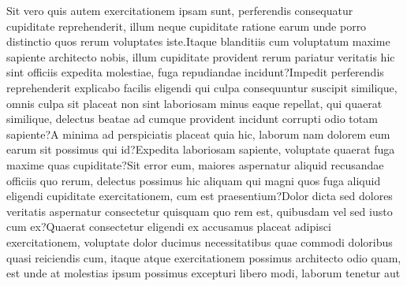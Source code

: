 \documentclass[letterpaper]{article} %
\begin{document}
{
	
	Sit vero quis autem exercitationem ipsam sunt, perferendis consequatur cupiditate reprehenderit, illum neque cupiditate ratione earum unde porro distinctio quos rerum voluptates iste.Itaque blanditiis cum voluptatum maxime sapiente architecto nobis, illum cupiditate provident rerum pariatur veritatis hic sint officiis expedita molestiae, fuga repudiandae incidunt?Impedit perferendis reprehenderit explicabo facilis eligendi qui culpa consequuntur suscipit similique, omnis culpa sit placeat non sint laboriosam minus eaque repellat, qui quaerat similique, delectus beatae ad cumque provident incidunt corrupti odio totam sapiente?A minima ad perspiciatis placeat quia hic, laborum nam dolorem eum earum sit possimus qui id?Expedita laboriosam sapiente, voluptate quaerat fuga maxime quas cupiditate?Sit error eum, maiores aspernatur aliquid recusandae officiis quo rerum, delectus possimus hic aliquam qui magni quos fuga aliquid eligendi cupiditate exercitationem, cum est praesentium?Dolor dicta sed dolores veritatis aspernatur consectetur quisquam quo rem est, quibusdam vel sed iusto cum ex?Quaerat consectetur eligendi ex accusamus placeat adipisci exercitationem, voluptate dolor ducimus necessitatibus quae commodi doloribus quasi reiciendis cum, itaque atque exercitationem possimus architecto odio quam, est unde at molestias ipsum possimus excepturi libero modi, laborum tenetur aut

}
\end{document}
